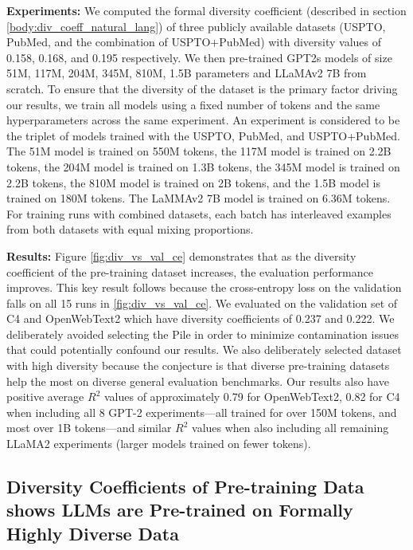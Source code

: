 \textbf{Experiments: } 
We computed the formal diversity coefficient (described in section \ref{body:div_coeff_natural_lang}) of three publicly available datasets (USPTO, PubMed, and the combination of USPTO+PubMed) with diversity values of 0.158, 0.168, and 0.195 respectively. 
We then pre-trained GPT2s \citep{gpt2} models of size 51M, 117M, 204M, 345M, 810M, 1.5B parameters and LLaMAv2 7B \citep{llamav2} from scratch. 
To ensure that the diversity of the dataset is the primary factor driving our results, we train all models using a fixed number of tokens and the same hyperparameters across the same experiment. 
An experiment is considered to be the triplet of models trained with the USPTO, PubMed, and USPTO+PubMed. 
The 51M model is trained on 550M tokens, the 117M model is trained on 2.2B tokens, the 204M model is trained on 1.3B tokens, the 345M model is trained on 2.2B tokens, the 810M model is trained on 2B tokens, and the 1.5B model is trained on 180M tokens. 
The LaMMAv2 7B model is trained on 6.36M tokens. 
For training runs with combined datasets, each batch has interleaved examples from both datasets with equal mixing proportions. 

\textbf{Results: }
Figure \ref{fig:div_vs_val_ce} demonstrates that as the diversity coefficient of the pre-training dataset increases, the evaluation performance improves. 
This key result follows because the cross-entropy loss on the validation falls on all 15 runs in \ref{fig:div_vs_val_ce}. 
We evaluated on the validation set of C4 and OpenWebText2 which have diversity coefficients of 0.237 and 0.222. 
We deliberately avoided selecting the Pile in order to minimize contamination issues that could potentially confound our results. 
We also deliberately selected dataset with high diversity because the conjecture is that diverse pre-training datasets help the most on diverse general evaluation benchmarks. 
Our results also have positive average $R^2$ values of approximately 0.79 for OpenWebText2, 0.82 for C4 when including all 8 GPT-2 experiments---all trained for over 150M tokens, and most over 1B tokens---and similar $R^2$ values when also including all remaining LLaMA2 experiments (larger models trained on fewer tokens). 

\subsection{Diversity Coefficients of Pre-training Data shows LLMs are Pre-trained on Formally Highly Diverse Data}

